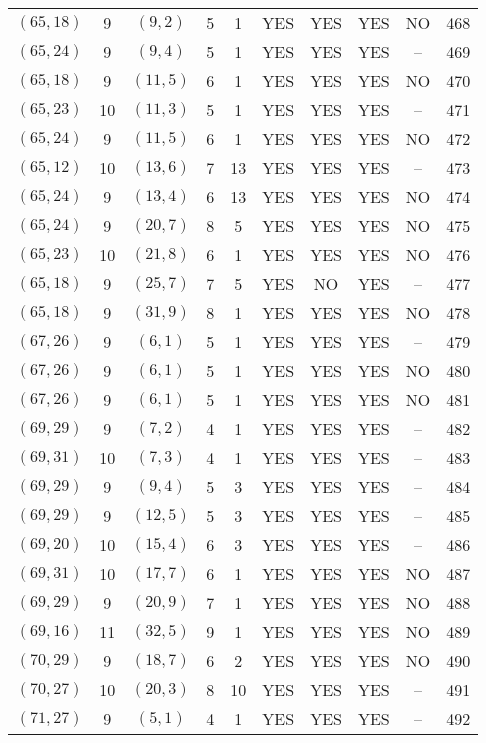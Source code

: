 \begin{longtable}{|c|c|c|c|c|c|c|c|c|c|}
$(65, 18)$ & 9 & $(9, 2)$ & 5 & 1 & YES & YES & YES & NO & 468\\
$(65, 24)$ & 9 & $(9, 4)$ & 5 & 1 & YES & YES & YES & -- & 469\\
$(65, 18)$ & 9 & $(11, 5)$ & 6 & 1 & YES & YES & YES & NO & 470\\
$(65, 23)$ & 10 & $(11, 3)$ & 5 & 1 & YES & YES & YES & -- & 471\\
$(65, 24)$ & 9 & $(11, 5)$ & 6 & 1 & YES & YES & YES & NO & 472\\
$(65, 12)$ & 10 & $(13, 6)$ & 7 & 13 & YES & YES & YES & -- & 473\\
$(65, 24)$ & 9 & $(13, 4)$ & 6 & 13 & YES & YES & YES & NO & 474\\
$(65, 24)$ & 9 & $(20, 7)$ & 8 & 5 & YES & YES & YES & NO & 475\\
$(65, 23)$ & 10 & $(21, 8)$ & 6 & 1 & YES & YES & YES & NO & 476\\
$(65, 18)$ & 9 & $(25, 7)$ & 7 & 5 & YES & NO & YES & -- & 477\\
$(65, 18)$ & 9 & $(31, 9)$ & 8 & 1 & YES & YES & YES & NO & 478\\
$(67, 26)$ & 9 & $(6, 1)$ & 5 & 1 & YES & YES & YES & -- & 479\\
$(67, 26)$ & 9 & $(6, 1)$ & 5 & 1 & YES & YES & YES & NO & 480\\
$(67, 26)$ & 9 & $(6, 1)$ & 5 & 1 & YES & YES & YES & NO & 481\\
$(69, 29)$ & 9 & $(7, 2)$ & 4 & 1 & YES & YES & YES & -- & 482\\
$(69, 31)$ & 10 & $(7, 3)$ & 4 & 1 & YES & YES & YES & -- & 483\\
$(69, 29)$ & 9 & $(9, 4)$ & 5 & 3 & YES & YES & YES & -- & 484\\
$(69, 29)$ & 9 & $(12, 5)$ & 5 & 3 & YES & YES & YES & -- & 485\\
$(69, 20)$ & 10 & $(15, 4)$ & 6 & 3 & YES & YES & YES & -- & 486\\
$(69, 31)$ & 10 & $(17, 7)$ & 6 & 1 & YES & YES & YES & NO & 487\\
$(69, 29)$ & 9 & $(20, 9)$ & 7 & 1 & YES & YES & YES & NO & 488\\
$(69, 16)$ & 11 & $(32, 5)$ & 9 & 1 & YES & YES & YES & NO & 489\\
$(70, 29)$ & 9 & $(18, 7)$ & 6 & 2 & YES & YES & YES & NO & 490\\
$(70, 27)$ & 10 & $(20, 3)$ & 8 & 10 & YES & YES & YES & -- & 491\\
$(71, 27)$ & 9 & $(5, 1)$ & 4 & 1 & YES & YES & YES & -- & 492\\

\end{longtable}
